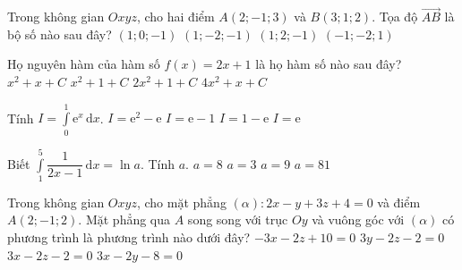 \begin{ex}%
	Trong không gian $ Oxyz $, cho hai điểm $ A(2;-1;3) $ và $ B(3;1;2) $. Tọa độ $ \vec{AB} $ là bộ số nào sau đây?
	\choice
	{$ (1;0;-1) $}
	{$ (1;-2;-1) $}
	{\True $ (1;2;-1) $}
	{$ (-1;-2;1) $}
\end{ex}
\begin{ex}%
	Họ nguyên hàm của hàm số $ f(x)=2x+1 $ là họ hàm số nào sau đây?
	\choice
	{\True $ x^2+x+C $}
	{$ x^2+1+C $}
	{$ 2x^2+1+C $}
	{$ 4x^2+x+C $}
\end{ex}
\begin{ex}%
	Tính $ I=\displaystyle\int\limits_0^1 \mathrm{e}^x\mathrm{\,d}x $.
	\choice
	{$ I=\mathrm{e}^2-\mathrm{e} $}
	{\True $ I=\mathrm{e}-1 $}
	{$ I=1-\mathrm{e} $}
	{$ I=\mathrm{e} $}
\end{ex}
\begin{ex}%
	Biết $ \displaystyle\int\limits_1^5\dfrac{1}{2x-1}\mathrm{\,d}x=\ln a  $. Tính $ a $.
	\choice
	{$ a=8 $}
	{\True $ a=3 $}
	{$ a=9 $}
	{$ a=81 $}
\end{ex}
\begin{ex}%
	Trong không gian $ Oxyz $, cho mặt phẳng $ (\alpha)\colon 2x-y+3z+4=0 $ và điểm $ A(2;-1;2) $. Mặt phẳng qua $ A $ song song với trục $ Oy $ và vuông góc với $ (\alpha) $ có phương trình là phương trình nào dưới đây?
	\choice
	{$ -3x-2z+10=0 $}
	{$ 3y-2z-2=0 $}
	{\True $ 3x-2z-2=0 $}
	{$ 3x-2y-8=0 $}
\end{ex}
